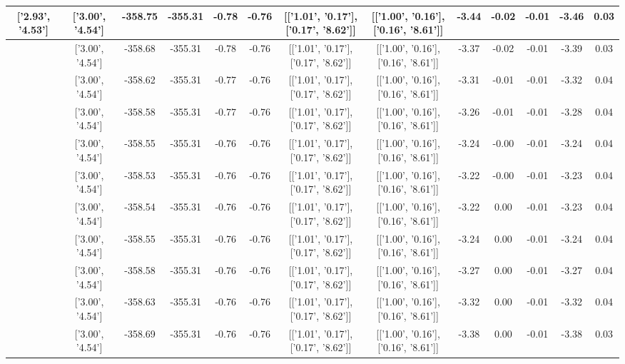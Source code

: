 \begin{table}[htbp]
\begin{adjustbox}{angle=90}
\begin{tabular}{|c|c|c|c|c|c|c|c|c|c|c|c|c|}
 ['2.93', '4.53'] & ['3.00', '4.54'] & -358.75 & -355.31 & -0.78 & -0.76 & [['1.01', '0.17'], ['0.17', '8.62']] & [['1.00', '0.16'], ['0.16', '8.61']] & -3.44 & -0.02 & -0.01 & -3.46 & 0.03\\ \hline
 ['2.95', '4.53'] & ['3.00', '4.54'] & -358.68 & -355.31 & -0.78 & -0.76 & [['1.01', '0.17'], ['0.17', '8.62']] & [['1.00', '0.16'], ['0.16', '8.61']] & -3.37 & -0.02 & -0.01 & -3.39 & 0.03\\ \hline
 ['2.96', '4.54'] & ['3.00', '4.54'] & -358.62 & -355.31 & -0.77 & -0.76 & [['1.01', '0.17'], ['0.17', '8.62']] & [['1.00', '0.16'], ['0.16', '8.61']] & -3.31 & -0.01 & -0.01 & -3.32 & 0.04\\ \hline
 ['2.97', '4.54'] & ['3.00', '4.54'] & -358.58 & -355.31 & -0.77 & -0.76 & [['1.01', '0.17'], ['0.17', '8.62']] & [['1.00', '0.16'], ['0.16', '8.61']] & -3.26 & -0.01 & -0.01 & -3.28 & 0.04\\ \hline
 ['2.98', '4.54'] & ['3.00', '4.54'] & -358.55 & -355.31 & -0.76 & -0.76 & [['1.01', '0.17'], ['0.17', '8.62']] & [['1.00', '0.16'], ['0.16', '8.61']] & -3.24 & -0.00 & -0.01 & -3.24 & 0.04\\ \hline
 ['2.99', '4.54'] & ['3.00', '4.54'] & -358.53 & -355.31 & -0.76 & -0.76 & [['1.01', '0.17'], ['0.17', '8.62']] & [['1.00', '0.16'], ['0.16', '8.61']] & -3.22 & -0.00 & -0.01 & -3.23 & 0.04\\ \hline
 ['3.01', '4.54'] & ['3.00', '4.54'] & -358.54 & -355.31 & -0.76 & -0.76 & [['1.01', '0.17'], ['0.17', '8.62']] & [['1.00', '0.16'], ['0.16', '8.61']] & -3.22 & 0.00 & -0.01 & -3.23 & 0.04\\ \hline
 ['3.02', '4.54'] & ['3.00', '4.54'] & -358.55 & -355.31 & -0.76 & -0.76 & [['1.01', '0.17'], ['0.17', '8.62']] & [['1.00', '0.16'], ['0.16', '8.61']] & -3.24 & 0.00 & -0.01 & -3.24 & 0.04\\ \hline
 ['3.03', '4.54'] & ['3.00', '4.54'] & -358.58 & -355.31 & -0.76 & -0.76 & [['1.01', '0.17'], ['0.17', '8.62']] & [['1.00', '0.16'], ['0.16', '8.61']] & -3.27 & 0.00 & -0.01 & -3.27 & 0.04\\ \hline
 ['3.04', '4.54'] & ['3.00', '4.54'] & -358.63 & -355.31 & -0.76 & -0.76 & [['1.01', '0.17'], ['0.17', '8.62']] & [['1.00', '0.16'], ['0.16', '8.61']] & -3.32 & 0.00 & -0.01 & -3.32 & 0.04\\ \hline
 ['3.05', '4.54'] & ['3.00', '4.54'] & -358.69 & -355.31 & -0.76 & -0.76 & [['1.01', '0.17'], ['0.17', '8.62']] & [['1.00', '0.16'], ['0.16', '8.61']] & -3.38 & 0.00 & -0.01 & -3.38 & 0.03\\ \hline

\end{tabular}
\end{adjustbox}
\end{table}
